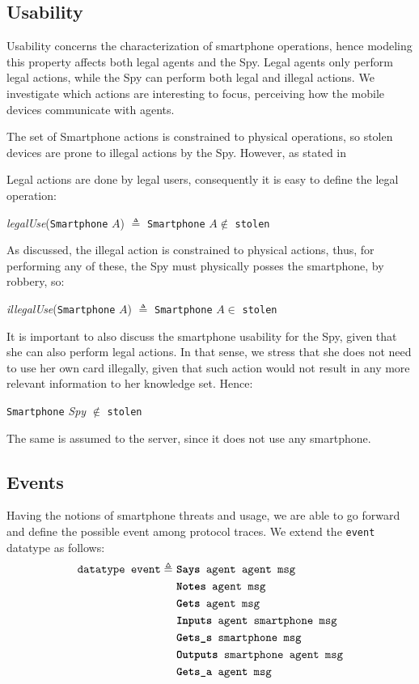 \subsection{Usability}
\label{ssec:usability}
Usability concerns the characterization of smartphone operations, hence modeling this property affects both legal agents and the Spy. Legal agents only perform legal actions, while the Spy can perform both legal and illegal actions. We investigate which actions are interesting to focus, perceiving how the mobile devices communicate with agents.

The set of Smartphone actions is constrained to physical operations, so stolen devices are prone to illegal actions by the Spy. However, as stated in

Legal actions are done by legal users, consequently it is easy to define the legal operation:
%
\begin{center}
  \textit{legalUse}(\texttt{Smartphone} $A$) $\triangleq$ \texttt{Smartphone} $A \notin$ \texttt{stolen}
\end{center}
%
As discussed, the illegal action is constrained to physical actions, thus, for performing any of these, the Spy must physically posses the smartphone, by robbery, so:
%
\begin{center}
  \textit{illegalUse}(\texttt{Smartphone} $A$) $\triangleq$ \texttt{Smartphone} $A \in$ \texttt{stolen}
\end{center}
%
It is important to also discuss the smartphone usability for the Spy, given that she can also perform legal actions. In that sense, we stress that she does not need to use her own card illegally, given that such action would not result in any more relevant information to her knowledge set. Hence:
%
\begin{center}
  \texttt{Smartphone} \textit{Spy} $\notin$ \texttt{stolen}
\end{center}
%
The same is assumed to the server, since it does not use any smartphone.



\subsection{Events}
Having the notions of smartphone threats and usage, we are able to go forward and define the possible event among protocol traces. We extend the \texttt{event} datatype as follows:
%
\begin{equation*}
  \begin{split}
    \texttt{datatype event} \triangleq \
    & \texttt{\textbf{Says} agent agent msg} \\
    & \texttt{\textbf{Notes} agent msg} \\
    & \texttt{\textbf{Gets} agent msg} \\
    & \texttt{\textbf{Inputs} agent smartphone msg} \\
    & \texttt{\textbf{Gets\_s} smartphone msg} \\
    & \texttt{\textbf{Outputs} smartphone agent msg} \\
    & \texttt{\textbf{Gets\_a} agent msg}
  \end{split}
\end{equation*}


